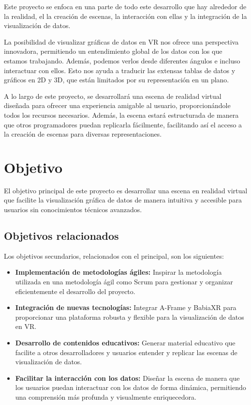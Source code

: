 \documentclass[a4paper, 12pt]{book}
\begin{document}
Este proyecto se enfoca en una parte de todo este desarrollo que hay alrededor de la realidad, el la creación de escenas, la interacción con ellas y la integración de la visualización de datos.

La posibilidad de visualizar gráficas de datos en VR nos ofrece una perspectiva innovadora, permitiendo un entendimiento global de los datos con los que estamos trabajando. Además, podemos verlos desde diferentes ángulos e incluso interactuar con ellos. Esto nos ayuda a traducir las extensas tablas de datos y gráficos en 2D y 3D, que están limitados por su representación en un plano.

A lo largo de este proyecto, se desarrollará una escena de realidad virtual diseñada para ofrecer una experiencia amigable al usuario, proporcionándole todos los recursos necesarios. Además, la escena estará estructurada de manera que otros programadores puedan replicarla fácilmente, facilitando así el acceso a la creación de escenas para diversas representaciones. 

\section{Objetivo}
\label{sec:estructura}

El objetivo principal de este proyecto es desarrollar una escena en realidad virtual que facilite la visualización gráfica de datos de manera intuitiva y accesible para usuarios sin conocimientos técnicos avanzados.

\subsection{Objetivos relacionados}
Los objetivos secundarios, relacionados con el principal, son los siguientes:
\begin{itemize}
    \item \textbf{Implementación de metodologías ágiles:} Inspirar la metodología utilizada en una metodología ágil como Scrum para gestionar y organizar eficientemente el desarrollo del proyecto.
    \item \textbf{Integración de nuevas tecnologías:} Integrar A-Frame y BabiaXR para proporcionar una plataforma robusta y flexible para la visualización de datos en VR.
    \item \textbf{Desarrollo de contenidos educativos:} Generar material educativo que facilite a otros desarrolladores y usuarios entender y replicar las escenas de visualización de datos.
    \item \textbf{Facilitar la interacción con los datos:} Diseñar la escena de manera que los usuarios puedan interactuar con los datos de forma dinámica, permitiendo una comprensión más profunda y visualmente enriquecedora.
\end{itemize}
\end{document}

